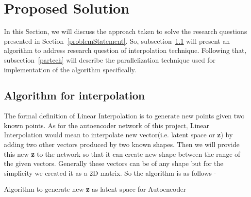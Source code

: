 \documentclass[11pt]{article}       %
\begin{document}
\section{Proposed Solution} \label{proposedSolution}
In this Section, we will discuss the approach taken to solve the research questions presented in Section~\ref{problemStatement}. So, subsection~\ref{algo} will present an algorithm to address research question of interpolation technique. Following that, subsection~\ref{partech} will describe the parallelization technique used for implementation of the algorithm specifically.
\subsection{Algorithm for interpolation} \label{algo}
The formal definition of Linear Interpolation is to generate new points given two known points. As for the autoencoder network of this project, Linear Interpolation would mean to interpolate new vector(i.e. latent space or \textbf{z}) by adding two other vectors produced by two known shapes. Then we will provide this new \textbf{z} to the network so that it can create new shape between the range of the given vectors. Generally these vectors can be of any shape but for the simplicity we created it as a 2D matrix. So the algorithm is as follows -


\begin{algorithm}
  \caption {Algorithm to generate new \textbf{z} as latent space for Autoencoder} \label{algoZ}
  \begin{algorithmic}[1]
      	 \EndFor
        \EndFor						
      \EndFor
    
  \end{algorithmic}
\end{algorithm}
\end{document}
